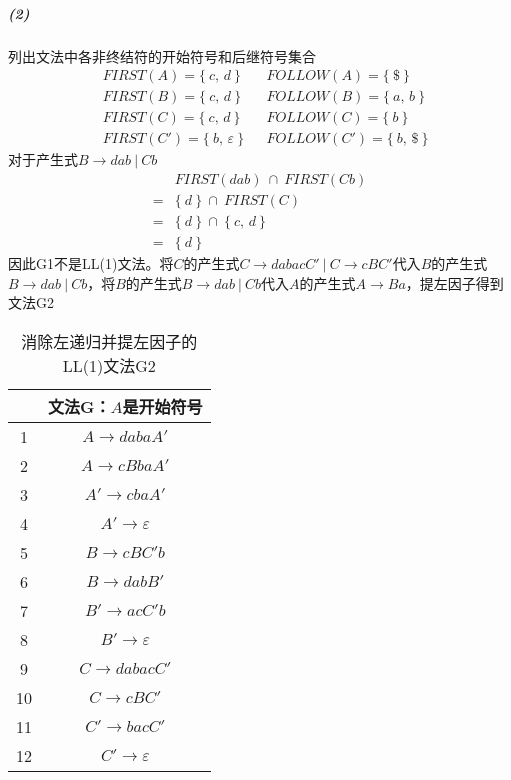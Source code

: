 \documentclass{article}
\begin{document}
\subparagraph{(2)}
列出文法中各非终结符的开始符号和后继符号集合
\begin{align*}
    &FIRST(A) = \big\{\  c,\,d \ \big\} &&FOLLOW(A) = \big\{\  \texttt{\$} \ \big\} \\
    &FIRST(B) = \big\{\  c,\,d \ \big\} &&FOLLOW(B) = \big\{\  a,\,b \ \big\} \\
    &FIRST(C) = \big\{\  c,\,d \ \big\} &&FOLLOW(C) = \big\{\  b \ \big\} \\
    &FIRST(C') = \big\{\  b,\,\varepsilon \ \big\} &&FOLLOW(C') = \big\{\  b,\,\texttt{\$} \ \big\}
\end{align*}
对于产生式$B \rightarrow dab\ |\ Cb$
\begin{align*}
    &FIRST(dab) \ \cap \  FIRST(Cb) \\
    =& \big\{\ d\ \big\} \ \cap \  FIRST(C) \\
    =& \big\{\ d\ \big\} \ \cap \  \big\{\ c,\,d\ \big\} \\
    =& \big\{\ d\ \big\}
\end{align*}
因此G1不是LL(1)文法。将$C$的产生式$C \rightarrow dabacC'\ |\ C \rightarrow cBC'$代入$B$的产生式$B \rightarrow dab\ |\ Cb$，将$B$的产生式$B \rightarrow dab\ |\ Cb$代入$A$的产生式$A \rightarrow Ba$，提左因子得到文法G2
\begin{table}[H]
    \centering
    \caption{消除左递归并提左因子的LL(1)文法G2}
    \label{table:3}
    \begin{tabular}{|c|c|}
        \hline
        & 文法G：$A$是开始符号 \\ \hline
        1 & $A \rightarrow dabaA'$ \\ \hline
        2 & $A \rightarrow cBbaA'$ \\ \hline
        3 & $A' \rightarrow cbaA'$ \\ \hline
        4 & $A' \rightarrow \varepsilon$ \\ \hline
        5 & $B \rightarrow cBC'b$ \\ \hline
        6 & $B \rightarrow dabB'$ \\ \hline
        7 & $B' \rightarrow acC'b$ \\ \hline
        8 & $B' \rightarrow \varepsilon$ \\ \hline
        9 & $C \rightarrow dabacC'$ \\ \hline
        10 & $C \rightarrow cBC'$ \\ \hline
        11 & $C' \rightarrow bacC'$ \\ \hline
        12 & $C' \rightarrow \varepsilon$ \\ \hline
    \end{tabular}
\end{table}
\end{document}
